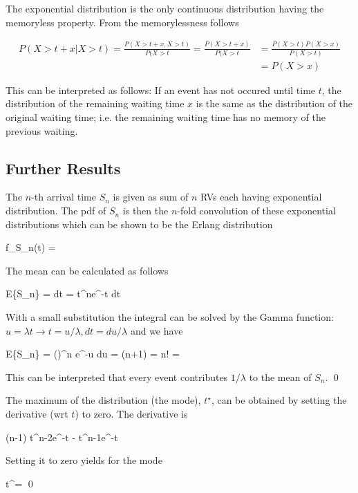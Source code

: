 The exponential distribution is the only continuous distribution having the memoryless property. From the memorylessness follows

\begin{align*}
P(X>t+x|X>t) = \frac{P(X>t+x, X>t)}{P(X>t} = \frac{P(X>t+x)}{P(X>t} &= \frac{P(X>t)P(X>x)}{P(X>t)} \\ &= P(X>x)
\end{align*}

This can be interpreted as follows: If an event has not occured until time $t$, the distribution of the remaining waiting time $x$ is the same as the distribution of the original waiting time; i.e. the remaining waiting time has no memory of the previous waiting.

\subsection{Further Results}

The $n$-th arrival time $S_n$ is given as sum of $n$ RVs each having exponential distribution. The pdf of $S_n$ is then the $n$-fold convolution of these exponential distributions which can be shown to be the Erlang distribution

\bee
f_{S_n}(t) = 
\eee

The mean can be calculated as follows

\bee
E\{S_n\} = \int {} dt =  \int t^{n}e^{-\lambda t} dt
\eee

With a small substitution the integral can be solved by the Gamma function: $u=\lambda t \rightarrow t=u/\lambda, dt = du/\lambda$ and we have

\bee
E\{S_n\} =   \int \left(\right)^n e^{-u} du =  \Gamma(n+1) =  n! = 
\eee

This can be interpreted that every event contributes $1/\lambda$ to the mean of $S_n$. \qed

The maximum of the distribution (the mode), $t^\star$, can be obtained by setting the derivative (wrt $t$) to zero. The derivative is

\bee
{} \propto (n-1) t^{n-2}e^{-\lambda t} - \lambda t^{n-1}e^{-\lambda t}
\eee

Setting it to zero yields for the mode

\bee
t^\star =  \qed
\eee

